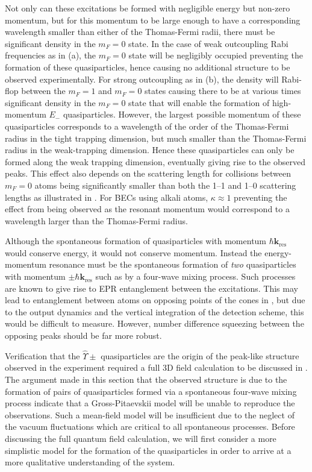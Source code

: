 Not only can these excitations be formed with negligible energy but non-zero momentum, but for this momentum to be large enough to have a corresponding wavelength smaller than either of the Thomas-Fermi radii, there must be significant density in the $m_F=0$ state. In the case of weak outcoupling Rabi frequencies as in (a), the $m_F=0$ state will be negligibly occupied preventing the formation of these quasiparticles, hence causing no additional structure to be observed experimentally. For strong outcoupling as in (b), the density will Rabi-flop between the $m_F=1$ and $m_F=0$ states causing there to be at various times significant density in the $m_F=0$ state that will enable the formation of high-momentum $E_-$ quasiparticles.  However, the largest possible momentum of these quasiparticles corresponds to a wavelength of the order of the Thomas-Fermi radius in the tight trapping dimension, but much smaller than the Thomas-Fermi radius in the weak-trapping dimension. Hence these quasiparticles can only be formed along the weak trapping dimension, eventually giving rise to the observed peaks. This effect also depends on the scattering length for collisions between $m_F=0$ atoms being significantly smaller than both the 1--1 and 1--0 scattering lengths as illustrated in . For BECs using alkali atoms, $\kappa \approx 1$ preventing the effect from being observed as the resonant momentum would correspond to a wavelength larger than the Thomas-Fermi radius.

Although the spontaneous formation of quasiparticles with momentum $\hbar \mathbf{k}_\text{res}$ would conserve energy, it would not conserve momentum. Instead the energy-momentum resonance must be the spontaneous formation of \emph{two} quasiparticles with momentum $\pm \hbar \mathbf{k}_\text{res}$ such as by a four-wave mixing process. Such processes are known to give rise to EPR entanglement between the excitations. This may lead to entanglement between atoms on opposing points of the cones in , but due to the output dynamics and the vertical integration of the detection scheme, this would be difficult to measure. However, number difference squeezing between the opposing peaks should be far more robust.

Verification that the $\hat{\Upsilon}\pm$ quasiparticles are the origin of the peak-like structure observed in the experiment required a full 3D field calculation to be discussed in .  The argument made in this section that the observed structure is due to the formation of pairs of quasiparticles formed via a spontaneous four-wave mixing process indicate that a Gross-Pitaevskii model will be unable to reproduce the observations. Such a mean-field model will be insufficient due to the neglect of the vacuum fluctuations which are critical to all spontaneous processes. Before discussing the full quantum field calculation, we will first consider a more simplistic model for the formation of the quasiparticles in order to arrive at a more qualitative understanding of the system.

